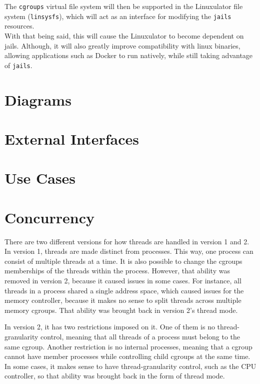 \documentclass[12pt, dvipsnames, a4paper]{article}
\begin{document}
The \texttt{cgroups} virtual file system will then be supported in the
Linuxulator file system (\texttt{linsysfs}), which will act as an interface
for modifying the \texttt{jails} resources.\\

With that being said, this will cause the Linuxulator to become dependent on
jails. Although, it will also greatly improve compatibility with linux
binaries, allowing applications such as Docker to run natively, while still
taking advantage of \texttt{jails}.

\section{Diagrams}
\lipsum[1]

\section{External Interfaces}
\lipsum[1]

\section{Use Cases}
\lipsum[1]


\section{Concurrency}
There are two different versions for how threads are handled in version 1 and 2. In version 1, threads are made distinct from processes. This way, one process can consist of multiple threads at a time. It is also possible to change the cgroups memberships of the threads within the process. However, that ability was removed in version 2, because it caused issues in some cases. For instance, all threads in a process shared a single address space, which caused issues for the memory controller, because it makes no sense to split threads across multiple memory cgroups. That ability was brought back in version 2’s thread mode.

In version 2, it has two restrictions imposed on it. One of them is no thread-granularity control, meaning that all threads of a process must belong to the same cgroup. Another restriction is no internal processes, meaning that a cgroup cannot have member processes while controlling child cgroups at the same time. In some cases, it makes sense to have thread-granularity control, such as the CPU controller, so that ability was brought back in the form of thread mode.
\end{document}
